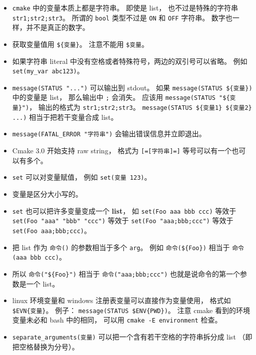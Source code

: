 \begin{itemize}
\item \verb`cmake` 中的变量本质上都是字符串。 即使是 list， 也不过是特殊的字符串 \verb`str1;str2;str3`。 所谓的 \verb`bool` 类型不过是 \verb`ON` 和 \verb`OFF` 字符串。 数字也一样，并不是真正的数字。
\item 获取变量值用 \verb`${变量}`。 注意不能用 \verb`$变量`。
\item 如果字符串 literal 中没有空格或者特殊符号，两边的双引号可以省略。 例如 \verb`set(my_var abc123)`。
\item \verb`message(STATUS "...")` 可以输出到 stdout。 如果 \verb`message(STATUS ${变量})` 中的变量是 list， 那么输出中 \verb`;` 会消失。 应该用 \verb`message(STATUS "${变量}")`， 输出的格式为 \verb`str1;str2;str3`。 \verb`message(STATUS ${变量1} ${变量2} ...)` 相当于把若干变量合成 list。
\item \verb`message(FATAL_ERROR "字符串")` 会输出错误信息并立即退出。
\item Cmake 3.0 开始支持 raw string， 格式为 \verb`[=[字符串]=]` 等号可以有一个也可以有多个。
\item \verb`set` 可以对变量赋值， 例如 \verb`set(变量 123)`。
\item 变量是区分大小写的。
\item \verb`set` 也可以把许多变量变成一个 \textbf{list}， 如 \verb`set(Foo aaa bbb ccc)` 等效于 \verb`set(Foo "aaa" "bbb" "ccc")` 等效于 \verb`set(Foo "aaa;bbb;ccc")` 等效于 \verb`set(Foo aaa;bbb;ccc)`。
\item 把 list 作为 \verb`命令()` 的参数相当于多个 \verb`arg`。 例如 \verb`命令(${Foo})` 相当于 \verb`命令(aaa bbb ccc)`。
\item 所以 \verb`命令("${Foo}")` 相当于 \verb`命令("aaa;bbb;ccc")` 也就是说命令的第一个参数是一个 list。
\item linux 环境变量和 windows 注册表变量可以直接作为变量使用， 格式如 \verb`$EVN{变量}`。 例子： \verb`message(STATUS $ENV{PWD})`。 注意 cmake 看到的环境变量未必和 bash 中的相同， 可以用 \verb`cmake -E environment` 检查。
\item \verb`separate_arguments(变量)` 可以把一个含有若干空格的字符串拆分成 list （即把空格替换为分号）。
\end{itemize}

